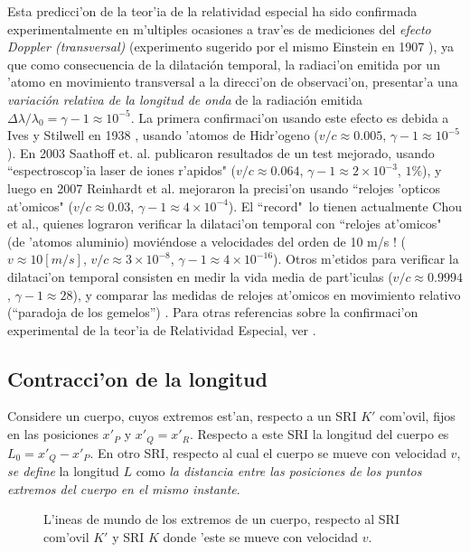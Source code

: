 Esta predicci'on de la teor'ia de la relatividad especial ha sido confirmada experimentalmente en m'ultiples ocasiones a trav'es de mediciones del \textit{efecto Doppler (transversal)} (experimento sugerido por el mismo Einstein en 1907 \cite{Einstein07}), ya que como consecuencia de la dilatación temporal, la radiaci'on emitida por un 'atomo en movimiento transversal a la direcci'on de observaci'on, presentar'a una \textit{variación relativa de la longitud de onda} de la radiación emitida $\Delta\lambda/\lambda_0=\gamma-1\approx 10^{-5}$. La primera confirmaci'on usando este efecto es debida a Ives y Stilwell en 1938 \cite{IS38}, usando 'atomos de Hidr'ogeno  ($v/c\approx 0.005$, $\gamma-1\approx 10^{-5}$). En 2003 Saathoff et. al. publicaron resultados de un test mejorado, usando ``espectroscop'ia laser de iones r'apidos" \cite{Saathoff03} ($v/c\approx 0.064$, $\gamma-1\approx 2\times 10^{-3}$, $1\%$), y luego en 2007 Reinhardt et al. mejoraron la precisi'on usando ``relojes 'opticos at'omicos" \cite{Reinhardt07} ($v/c\approx 0.03$, $\gamma-1\approx 4\times 10^{-4}$). El ``record"\, lo tienen actualmente Chou et al., quienes lograron verificar la dilataci'on temporal con ``relojes at'omicos" (de 'atomos aluminio) moviéndose a velocidades del orden de 10 m/s ! \cite{Chou10} ($v\approx 10 [m/s]$, $v/c\approx 3\times 10^{-8}$, $\gamma-1\approx 4\times 10^{-16}$). Otros m'etidos para verificar la dilataci'on temporal consisten en medir la vida media de part'iculas \cite{Bailey77} ($v/c\approx 0.9994$, $\gamma-1\approx 28$), y comparar las medidas de relojes at'omicos en movimiento relativo (``paradoja de los gemelos'') \cite{HK72a,HK72b}. Para otras referencias sobre la confirmaci'on experimental de la teor'ia de Relatividad Especial, ver \cite{SRexp}.

\subsection{Contracci'on de la longitud}
Considere un cuerpo, cuyos extremos est'an, respecto a un SRI $K'$ com'ovil, fijos en las posiciones $x'_P$ y $x'_Q=x'_R$. Respecto a este SRI la longitud del cuerpo es $L_0=x'_Q-x'_P$. En otro SRI, respecto al cual el cuerpo se mueve con velocidad $v$, \textit{se define} la longitud $L$ como \textit{la distancia entre las posiciones de los puntos extremos del cuerpo en el mismo instante}.
\begin{figure}[!h]
\centerline{}
 \caption{L'ineas de mundo de los extremos de un cuerpo, respecto al SRI com'ovil $K'$ y SRI $K$ donde 'este se mueve con velocidad $v$.}
\label{fcl}
\end{figure}

